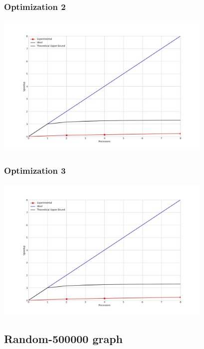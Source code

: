 \subsubsection{Optimization 2}
\begin{center}
    \resizebox{0.8\textwidth}{!}{}
    \includegraphics[width=0.78\textwidth]{../img/speedup-graph_type-random-250000-O2}
\end{center}

\subsubsection{Optimization 3}
\begin{center}
    \resizebox{0.8\textwidth}{!}{}
    \includegraphics[width=0.78\textwidth]{../img/speedup-graph_type-random-250000-O3}
\end{center}

\clearpage
\subsection{Random-500000 graph}
